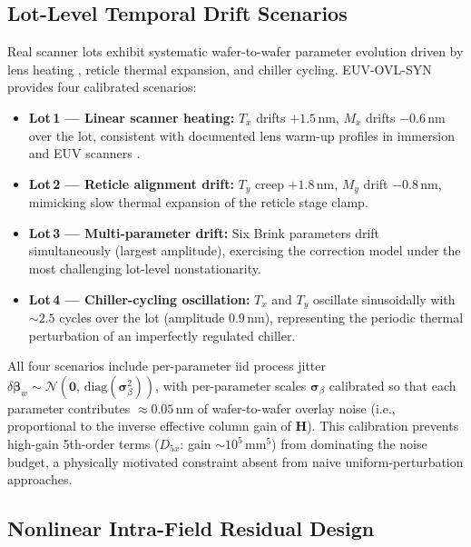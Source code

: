 \documentclass[10pt,conference]{IEEEtran}
\begin{document}
\subsection{Lot-Level Temporal Drift Scenarios}
\label{sec:drift}

Real scanner lots exhibit systematic wafer-to-wafer parameter evolution
driven by lens heating \cite{houlihan2007}, reticle thermal expansion, and
chiller cycling.  \textsc{EUV-OVL-SYN} provides four calibrated scenarios:

\begin{itemize}
  \item \textbf{Lot\,1 — Linear scanner heating:}
        $T_x$ drifts $+1.5$\,nm, $M_x$ drifts $-0.6$\,nm over the lot,
        consistent with documented lens warm-up profiles in immersion and
        EUV scanners \cite{houlihan2007, levinson2022}.
  \item \textbf{Lot\,2 — Reticle alignment drift:}
        $T_y$ creep $+1.8$\,nm, $M_y$ drift $-0.8$\,nm, mimicking slow
        thermal expansion of the reticle stage clamp.
  \item \textbf{Lot\,3 — Multi-parameter drift:}
        Six Brink parameters drift simultaneously (largest amplitude),
        exercising the correction model under the most challenging
        lot-level nonstationarity.
  \item \textbf{Lot\,4 — Chiller-cycling oscillation:}
        $T_x$ and $T_y$ oscillate sinusoidally with $\sim\!2.5$ cycles over
        the lot (amplitude $0.9$\,nm), representing the periodic thermal
        perturbation of an imperfectly regulated chiller.
\end{itemize}

All four scenarios include per-parameter iid process jitter
$\delta\bm{\beta}_w \sim \mathcal{N}(\mathbf{0},\,\text{diag}(\bm{\sigma}_\beta^2))$,
with per-parameter scales $\bm{\sigma}_\beta$ calibrated so that each
parameter contributes $\approx 0.05$\,nm of wafer-to-wafer overlay noise
(i.e., proportional to the inverse effective column gain of $\mathbf{H}$).
This calibration prevents high-gain 5th-order terms ($D_{5x}$: gain
$\sim\!10^5$\,mm$^5$) from dominating the noise budget, a physically
motivated constraint absent from naive uniform-perturbation approaches.

\subsection{Nonlinear Intra-Field Residual Design}
\label{sec:nonlinear}
\end{document}
